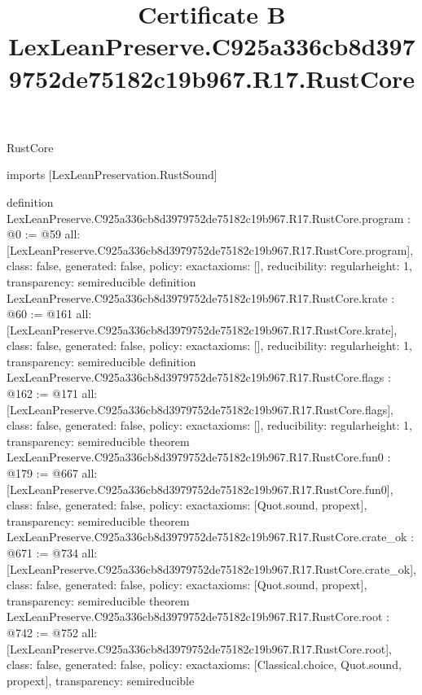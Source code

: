 \begin{lexlean}{RustCore}
\title{Certificate B LexLeanPreserve.C925a336cb8d3979752de75182c19b967.R17.RustCore}
\begin{coremodule}
imports [LexLeanPreservation.RustSound]

definition LexLeanPreserve.C925a336cb8d3979752de75182c19b967.R17.RustCore.program : @0 := @59 {
  all: [LexLeanPreserve.C925a336cb8d3979752de75182c19b967.R17.RustCore.program],
  class: false,
  generated: false,
  policy: exact{axioms: []},
  reducibility: regular{height: 1},
  transparency: semireducible
}
definition LexLeanPreserve.C925a336cb8d3979752de75182c19b967.R17.RustCore.krate : @60 := @161 {
  all: [LexLeanPreserve.C925a336cb8d3979752de75182c19b967.R17.RustCore.krate],
  class: false,
  generated: false,
  policy: exact{axioms: []},
  reducibility: regular{height: 1},
  transparency: semireducible
}
definition LexLeanPreserve.C925a336cb8d3979752de75182c19b967.R17.RustCore.flags : @162 := @171 {
  all: [LexLeanPreserve.C925a336cb8d3979752de75182c19b967.R17.RustCore.flags],
  class: false,
  generated: false,
  policy: exact{axioms: []},
  reducibility: regular{height: 1},
  transparency: semireducible
}
theorem LexLeanPreserve.C925a336cb8d3979752de75182c19b967.R17.RustCore.fun0 : @179 := @667 {
  all: [LexLeanPreserve.C925a336cb8d3979752de75182c19b967.R17.RustCore.fun0],
  class: false,
  generated: false,
  policy: exact{axioms: [Quot.sound, propext]},
  transparency: semireducible
}
theorem LexLeanPreserve.C925a336cb8d3979752de75182c19b967.R17.RustCore.crate_ok : @671 := @734 {
  all: [LexLeanPreserve.C925a336cb8d3979752de75182c19b967.R17.RustCore.crate_ok],
  class: false,
  generated: false,
  policy: exact{axioms: [Quot.sound, propext]},
  transparency: semireducible
}
theorem LexLeanPreserve.C925a336cb8d3979752de75182c19b967.R17.RustCore.root : @742 := @752 {
  all: [LexLeanPreserve.C925a336cb8d3979752de75182c19b967.R17.RustCore.root],
  class: false,
  generated: false,
  policy: exact{axioms: [Classical.choice, Quot.sound, propext]},
  transparency: semireducible
}


\end{coremodule}
\end{lexlean}
